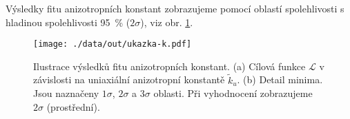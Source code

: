 Výsledky fitu anizotropních konstant zobrazujeme pomocí oblastí spolehlivosti s hladinou spolehlivosti \SI{95}{\percent} ($2\sigma$), viz obr. \ref{fig:ukazka-zpracovani-anizotropie}.

\begin{figure}[htbp]
    \centering
    \texttt{[image: ./data/out/ukazka-k.pdf]}
    \caption{Ilustrace výsledků fitu anizotropních konstant.
    (a) Cílová funkce $\mathcal{L}$ v závislosti na uniaxiální anizotropní konstantě $\tilde{k}_u$. (b) Detail minima. Jsou naznačeny $1\sigma$, $2\sigma$ a $3\sigma$ oblasti. Při vyhodnocení zobrazujeme $2\sigma$ (prostřední).}
    \label{fig:ukazka-zpracovani-anizotropie}
\end{figure}
